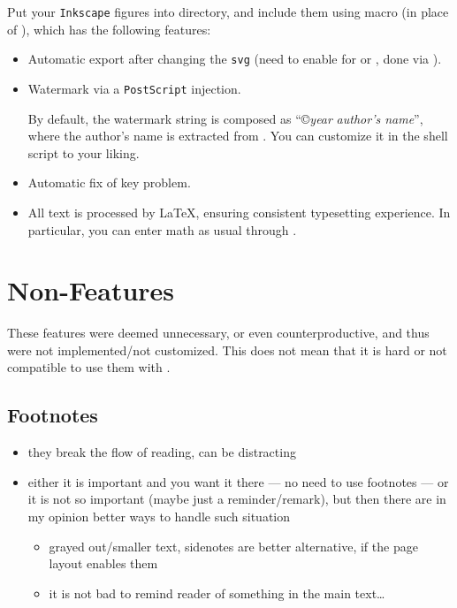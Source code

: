Put your \texttt{Inkscape} figures into  directory, and include them using  macro (in place of ), which has the following features:
\begin{itemize}
    \item Automatic export after changing the \texttt{svg} (need to enable  for  or , done via ).
    \item Watermark via a \texttt{PostScript} injection.
          \begin{remark}
              By default, the watermark string is composed as \enquote{\copyright \textlangle\textit{year}\textrangle{} \textlangle\textit{author's name}\textrangle}, where the author's name is extracted from \custommacro{\ThesisAuthorPlaintext}.
              You can customize it in the shell script  to your liking.
          \end{remark}
    \item Automatic fix of  key problem.
    \item All text is processed by \LaTeX{}, ensuring consistent typesetting experience.
          In particular, you can enter math as usual through .
\end{itemize}


\section{Non-Features}%
\label{sec:Non-Features}

These features were deemed unnecessary, or even counterproductive, and thus were not implemented/not customized.
This does not mean that it is hard or not compatible to use them with \TeXtured{}.

\subsection{Footnotes}%
\label{sub:Footnotes}

\begin{itemize}
    \item they break the flow of reading, can be distracting
    \item either it is important and you want it there --- no need to use footnotes --- or it is not so important (maybe just a reminder/remark), but then there are in my opinion better ways to handle such situation
          \begin{itemize}
              \item grayed out/smaller text, sidenotes are better alternative, if the page layout enables them
              \item it is not bad to remind reader of something in the main text\ldots
          \end{itemize}
\end{itemize}

